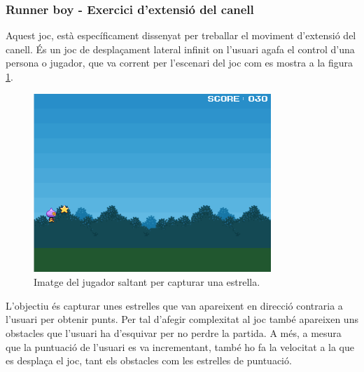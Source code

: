 \documentclass[12pt,a4paper,catalan]{article}
\begin{document}
	\subsubsection{Runner boy - Exercici d'extensió del canell}
	Aquest joc, està específicament dissenyat per treballar el moviment d'extensió del canell.
	És un joc de desplaçament lateral infinit on l'usuari agafa el control d'una persona o jugador, que va corrent per l'escenari del joc com es mostra a la figura \ref{fig:runnerboy-simple}.
	\begin{figure}[H]
		\includegraphics[width=0.8\textwidth,keepaspectratio]{runner-boy-simple.png}
		\centering
		\caption{Imatge del jugador saltant per capturar una estrella.}
		\label{fig:runnerboy-simple}
	\end{figure}
	L'objectiu és capturar unes estrelles que van apareixent en direcció contraria a l'usuari per obtenir punts. Per tal d'afegir complexitat al joc també apareixen uns obstacles que l'usuari ha d'esquivar per no perdre la partida. A més, a mesura que la puntuació de l'usuari es va incrementant, també ho fa la velocitat a la que es desplaça el joc, tant els obstacles com les estrelles de puntuació.
	
\end{document}
